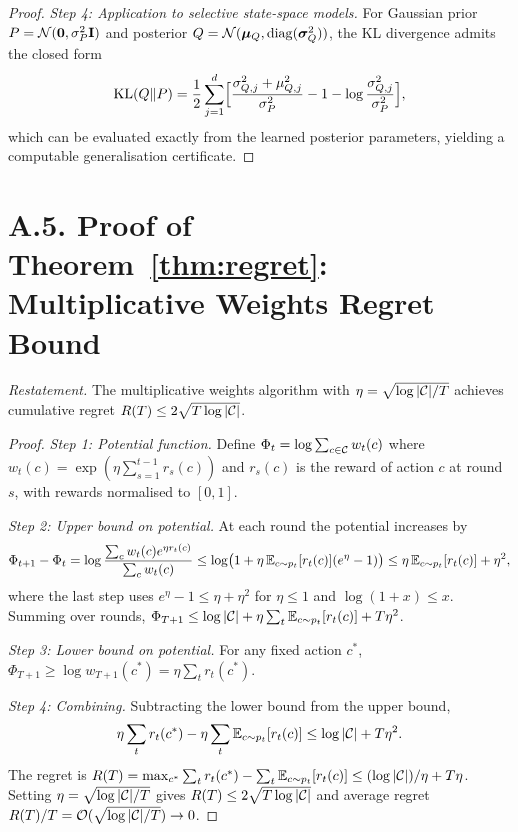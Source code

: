 \begin{proof}
\textit{Step 4: Application to selective state-space models.} For Gaussian prior $P=\mathcal{N}(\mathbf{0},\sigma_P^2\mathbf{I})$ and posterior $Q=\mathcal{N}(\bm{\mu}_Q,\mathrm{diag}(\bm{\sigma}_Q^2))$, the KL divergence admits the closed form
\begin{equation}
\mathrm{KL}(Q\|P) = \frac{1}{2}\sum_{j=1}^d\Bigl[\frac{\sigma_{Q,j}^2+\mu_{Q,j}^2}{\sigma_P^2}-1-\log\frac{\sigma_{Q,j}^2}{\sigma_P^2}\Bigr],
\end{equation}
which can be evaluated exactly from the learned posterior parameters, yielding a computable generalisation certificate.
\end{proof}


\section*{A.5. Proof of Theorem~\ref{thm:regret}: Multiplicative Weights Regret Bound}
\label{app:proof_regret}

\noindent\textit{Restatement.} The multiplicative weights algorithm with $\eta=\sqrt{\log|\mathcal{C}|/T}$ achieves cumulative regret $R(T)\le 2\sqrt{T\log|\mathcal{C}|}$.

\begin{proof}
\textit{Step 1: Potential function.} Define $\Phi_t = \log\sum_{c\in\mathcal{C}}w_t(c)$ where $w_t(c) = \exp(\eta\sum_{s=1}^{t-1}r_s(c))$ and $r_s(c)$ is the reward of action $c$ at round $s$, with rewards normalised to $[0,1]$.

\textit{Step 2: Upper bound on potential.} At each round the potential increases by
\begin{equation}
\Phi_{t+1}-\Phi_t = \log\frac{\sum_c w_t(c)e^{\eta r_t(c)}}{\sum_c w_t(c)}
\le \log\bigl(1+\eta\,\mathbb{E}_{c\sim p_t}[r_t(c)](e^\eta-1)\bigr)
\le \eta\,\mathbb{E}_{c\sim p_t}[r_t(c)] + \eta^2,
\end{equation}
where the last step uses $e^\eta-1\le\eta+\eta^2$ for $\eta\le 1$ and $\log(1+x)\le x$. Summing over rounds, $\Phi_{T+1}\le\log|\mathcal{C}|+\eta\sum_t\mathbb{E}_{c\sim p_t}[r_t(c)]+T\eta^2$.

\textit{Step 3: Lower bound on potential.} For any fixed action $c^*$, $\Phi_{T+1}\ge\log w_{T+1}(c^*) = \eta\sum_t r_t(c^*)$.

\textit{Step 4: Combining.} Subtracting the lower bound from the upper bound,
\begin{equation}
\eta\sum_t r_t(c^*) - \eta\sum_t\mathbb{E}_{c\sim p_t}[r_t(c)] \le \log|\mathcal{C}| + T\eta^2.
\end{equation}
The regret is $R(T) = \max_{c^*}\sum_t r_t(c^*) - \sum_t\mathbb{E}_{c\sim p_t}[r_t(c)] \le (\log|\mathcal{C}|)/\eta + T\eta$. Setting $\eta=\sqrt{\log|\mathcal{C}|/T}$ gives $R(T)\le 2\sqrt{T\log|\mathcal{C}|}$ and average regret $R(T)/T = \mathcal{O}(\sqrt{\log|\mathcal{C}|/T})\to 0$.
\end{proof}


